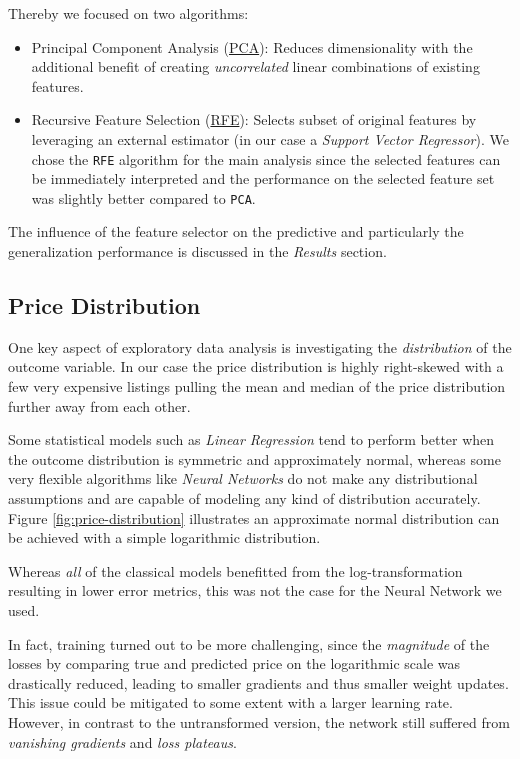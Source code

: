 Thereby we focused on two algorithms:
\begin{itemize}
  \item Principal Component Analysis (\href{https://scikit-learn.org/stable/modules/generated/sklearn.decomposition.PCA.html}{PCA}):
        Reduces dimensionality with the additional benefit of creating \emph{uncorrelated} linear combinations of existing features.
  \item Recursive Feature Selection (\href{https://scikit-learn.org/stable/modules/generated/sklearn.feature_selection.RFE.html}{RFE}):
        Selects subset of original features by leveraging an external estimator (in our case a \emph{Support Vector Regressor}).
        We chose the \texttt{RFE} algorithm for the main analysis since the selected features can be immediately interpreted and the performance on the selected feature set was slightly better compared to \texttt{PCA}.

\end{itemize}

The influence of the feature selector on the predictive and particularly the generalization performance is discussed in the \emph{Results} section.

\subsection{Price Distribution} \label{appendix:price-distribution}

One key aspect of exploratory data analysis is investigating the \emph{distribution} of the outcome variable.
In our case the price distribution is highly right-skewed with a few very expensive listings pulling the mean and median of the price distribution further away from each other.

Some statistical models such as \emph{Linear Regression} tend to perform better when the outcome distribution is symmetric and approximately normal, whereas some very flexible algorithms like \emph{Neural Networks} do not make any distributional assumptions and are capable of modeling any kind of distribution accurately.
Figure \ref{fig:price-distribution} illustrates an approximate normal distribution can be achieved with a simple logarithmic distribution.

Whereas \emph{all} of the classical models benefitted from the log-transformation resulting in lower error metrics, this was not the case for the Neural Network we used.

In fact, training turned out to be more challenging, since the \emph{magnitude} of the losses by comparing true and predicted price on the logarithmic scale was drastically reduced, leading to smaller gradients and thus smaller weight updates.
This issue could be mitigated to some extent with a larger learning rate.
However, in contrast to the untransformed version, the network still suffered from \emph{vanishing gradients} and \emph{loss plateaus}.

